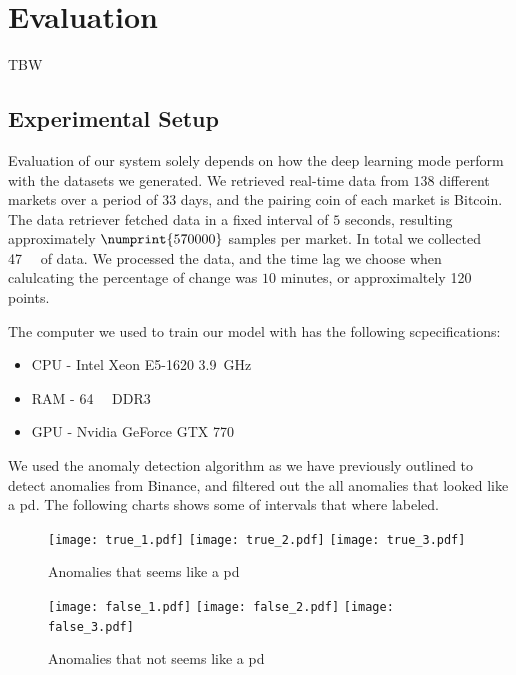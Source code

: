 
\chapter{Evaluation}\label{ch:evaluation}\glsresetall
TBW
\section{Experimental Setup}
Evaluation of our system solely depends on how the deep learning mode perform with the datasets we generated. We retrieved real-time data from $138$ different markets over a period of $33$ days, and the pairing coin of each market is Bitcoin. The data retriever fetched data in a fixed interval of $5$ seconds, resulting approximately $\numprint{570 000}$ samples per market. In total we collected \SI{47}{\giga\byte} of data. We processed the data, and the time lag we choose when calulcating the percentage of change was $10$ minutes, or approximaltely 120 points.

The computer we used to train our model with has the following scpecifications:
\begin{itemize}
    \item CPU - Intel Xeon E5-1620 \SI{3.9}{\giga\hertz}
    \item RAM - \SI{64}{\mebi\byte} DDR3 
    \item GPU - Nvidia GeForce GTX 770
\end{itemize}

We used the anomaly detection algorithm as we have previously outlined to detect anomalies from Binance, and filtered out the all anomalies that looked like a \ac{pd}. The following charts shows some of intervals that where labeled.

\begin{figure}
    \centering
    \texttt{[image: true\_1.pdf]}
    \texttt{[image: true\_2.pdf]}
    \texttt{[image: true\_3.pdf]}
    \caption{Anomalies that seems like a \ac{pd}}
    \label{fig:label_true}
\end{figure}

\begin{figure}
    \centering
    \texttt{[image: false\_1.pdf]}
    \texttt{[image: false\_2.pdf]}
    \texttt{[image: false\_3.pdf]}
    \caption{Anomalies that not seems like a \ac{pd}}
    \label{fig:label_false}
\end{figure}

